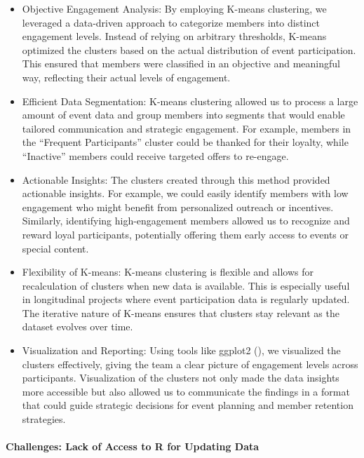 \documentclass[11pt,a4paper,]{article}
\begin{document}
\begin{itemize}
\item
  Objective Engagement Analysis: By employing K-means clustering, we leveraged a data-driven approach to categorize members into distinct engagement levels. Instead of relying on arbitrary thresholds, K-means optimized the clusters based on the actual distribution of event participation. This ensured that members were classified in an objective and meaningful way, reflecting their actual levels of engagement.
\item
  Efficient Data Segmentation: K-means clustering allowed us to process a large amount of event data and group members into segments that would enable tailored communication and strategic engagement. For example, members in the ``Frequent Participants'' cluster could be thanked for their loyalty, while ``Inactive'' members could receive targeted offers to re-engage.
\item
  Actionable Insights: The clusters created through this method provided actionable insights. For example, we could easily identify members with low engagement who might benefit from personalized outreach or incentives. Similarly, identifying high-engagement members allowed us to recognize and reward loyal participants, potentially offering them early access to events or special content.
\item
  Flexibility of K-means: K-means clustering is flexible and allows for recalculation of clusters when new data is available. This is especially useful in longitudinal projects where event participation data is regularly updated. The iterative nature of K-means ensures that clusters stay relevant as the dataset evolves over time.
\item
  Visualization and Reporting: Using tools like ggplot2 (\textcite{ggplot2}), we visualized the clusters effectively, giving the team a clear picture of engagement levels across participants. Visualization of the clusters not only made the data insights more accessible but also allowed us to communicate the findings in a format that could guide strategic decisions for event planning and member retention strategies.
\end{itemize}

\paragraph{Challenges: Lack of Access to R for Updating Data}\label{challenges-lack-of-access-to-r-for-updating-data}
\end{document}

